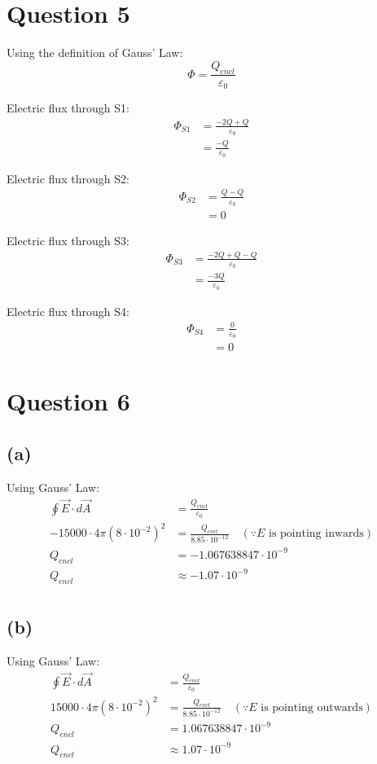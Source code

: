 \documentclass[11pt]{article}
\begin{document}
\section{Question 5}
\label{sec:org0fe1eae}
Using the definition of Gauss' Law:
\[\Phi = \frac{Q_{encl}}{\varepsilon_0}\]

Electric flux through S1:
\begin{align*}
\Phi_{S1} &= \frac{-2Q + Q}{\varepsilon_0} \\
&= \frac{-Q}{\varepsilon_0}
\end{align*}

Electric flux through S2:
\begin{align*}
\Phi_{S2} &= \frac{Q - Q}{\varepsilon_0} \\
&= 0
\end{align*}

Electric flux through S3:
\begin{align*}
\Phi_{S3} &= \frac{-2Q + Q - Q}{\varepsilon_0} \\
&= \frac{-3Q}{\varepsilon_0}
\end{align*}

Electric flux through S4:
\begin{align*}
\Phi_{S4} &= \frac{0}{\varepsilon_0} \\
&= 0
\end{align*}
\section{Question 6}
\label{sec:org03eaf38}

\subsection{(a)}
\label{sec:orgbb73858}
Using Gauss' Law:
\begin{align*}
\oint \vec{E} \cdot d \vec{A} &= \frac{Q_{encl}}{\varepsilon_0} \\
-15000 \cdot 4 \pi (8 \cdot 10^{-2})^2 &= \frac{Q_{encl}}{8.85 \cdot 10^{-12}} \quad (\because E \text{ is pointing inwards}) \\
Q_{encl} &= -1.067638847 \cdot 10^{-9} \\
Q_{encl} &\approx -1.07 \cdot 10^{-9} \\
\end{align*}
\subsection{(b)}
\label{sec:org5d7a974}
Using Gauss' Law:
\begin{align*}
\oint \vec{E} \cdot d \vec{A} &= \frac{Q_{encl}}{\varepsilon_0} \\
15000 \cdot 4 \pi (8 \cdot 10^{-2})^2 &= \frac{Q_{encl}}{8.85 \cdot 10^{-12}} \quad (\because E \text{ is pointing outwards}) \\
Q_{encl} &= 1.067638847 \cdot 10^{-9} \\
Q_{encl} &\approx 1.07 \cdot 10^{-9} \\
\end{align*}
\end{document}
